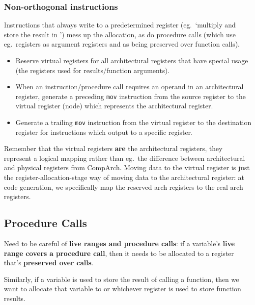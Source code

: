 \documentclass[a4paper, 11pt]{article}
\begin{document}
{{        \subsubsection*{Non-orthogonal instructions}
        {
            Instructions that always write to a predetermined register (eg.\ `multiply and store the result in ') mess up the allocation, as do procedure calls (which use eg.\ registers  as argument registers and  as being preserved over function calls).

            \begin{itemize}
            \item Reserve virtual registers for all architectural registers that have special usage (the registers used for results/function arguments).
            \item When an instruction/procedure call requires an operand in an architectural register, generate a preceding \texttt{mov} instruction from the source register to the virtual register (node) which represents the architectural register.
            \item Generate a trailing \texttt{mov} instruction from the virtual register to the destination register for instructions which output to a specific register.
            \end{itemize}

            Remember that the virtual registers \textbf{are} the architectural registers, they represent a logical mapping rather than eg.\ the difference between architectural and physical registers from CompArch. Moving data to the virtual register is just the register-allocation-stage way of moving data to the architectural register: at code generation, we specifically map the reserved arch registers to the real arch registers.
        }
    }
    \subsection*{Procedure Calls}
    {
        Need to be careful of \textbf{live ranges and procedure calls}: if a variable's \textbf{live range covers a procedure call}, then it needs to be allocated to a register that's \textbf{preserved over calls}.
        
        Similarly, if a variable is used to store the result of calling a function, then we want to allocate that variable to  or whichever register is used to store function results.
    }
}
\end{document}
